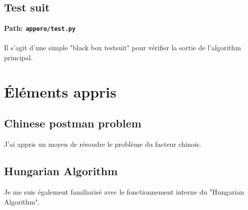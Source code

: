 \documentclass[11pt]{article}
\begin{document}
\subsection{Test suit}
\textbf{Path: \texttt{appero/test.py}}\\\\
Il s'agit d'une simple "black box testsuit" pour vérifier
la sortie de l'algorithm principal.
\section{Éléments appris}
\subsection{Chinese postman problem}
J'ai appris un moyen de résoudre le problème du facteur chinois.
\subsection{Hungarian Algorithm}
Je me suis également familiarisé avec le fonctionnement interne du
"Hungarian Algorithm".
\end{document}
